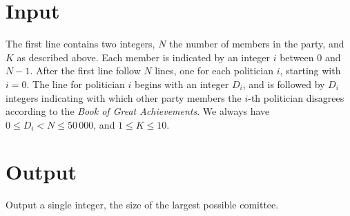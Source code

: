 \section*{Input}
The first line contains two integers,  $N$ the number of members in the party, and $K$ as described above. Each member is indicated by an integer $i$ between $0$ and $N-1$. After the first line follow $N$ lines, one for each politician $i$, starting with $i = 0$. The line for politician $i$ begins with an integer $D_i$, and is followed by $D_i$ integers indicating with which other party members the $i$-th politician disagrees according to the \emph{Book of Great Achievements}.
%
We always have $0 \leq D_i < N \leq 50\,000$, and $1 \leq K \leq 10$. 
%
%

\section*{Output}
Output a single integer, the size of the largest possible comittee.
